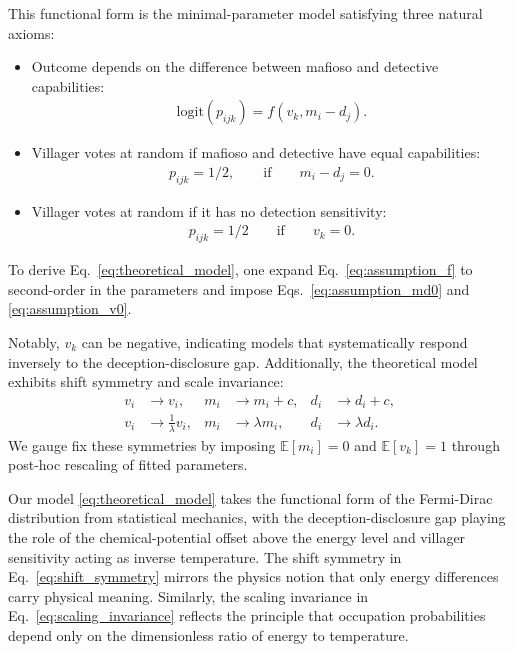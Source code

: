 \documentclass[sigconf]{aamas}
\begin{document}
This functional form is the minimal-parameter model satisfying three natural axioms:
\begin{itemize}
    \item Outcome depends on the difference between mafioso and detective capabilities:
    \begin{align}
        \text{logit}(p_{ijk})=f(v_k,m_i-d_j).
        \label{eq:assumption_f}
    \end{align}
    \item Villager votes at random if mafioso and detective have equal capabilities:
    \begin{align}
        p_{ijk}=1/2,\qquad\text{if} \qquad m_i-d_j=0.
        \label{eq:assumption_md0}
    \end{align}
    \item Villager votes at random if it has no detection sensitivity:
    \begin{align}
        p_{ijk}=1/2\qquad\text{if}\qquad v_k=0.
        \label{eq:assumption_v0}
    \end{align}
\end{itemize}
To derive Eq.~\eqref{eq:theoretical_model}, one expand Eq.~\eqref{eq:assumption_f} to second-order in the parameters and impose Eqs.~\eqref{eq:assumption_md0} and \eqref{eq:assumption_v0}.

Notably, $v_k$ can be negative, indicating models that systematically respond inversely to the deception-disclosure gap. Additionally, the theoretical model exhibits shift symmetry and scale invariance:
\begin{align}
    v_i &\rightarrow v_i, & m_i &\rightarrow m_i + c, & d_i &\rightarrow d_i + c,
    \label{eq:shift_symmetry} \\
    v_i &\rightarrow \frac{1}{\lambda} v_i, & m_i &\rightarrow \lambda m_i, & d_i &\rightarrow \lambda d_i. \label{eq:scaling_invariance}
\end{align}
We gauge fix these symmetries by imposing $\mathbb{E}[m_i]=0$ and $\mathbb{E}[v_k]=1$ through post-hoc rescaling of fitted parameters.


Our model \eqref{eq:theoretical_model} takes the functional form of the Fermi-Dirac distribution from statistical mechanics, with the deception-disclosure gap playing the role of the chemical-potential offset above the energy level and villager sensitivity acting as inverse temperature. The shift symmetry in Eq.~\eqref{eq:shift_symmetry} mirrors the physics notion that only energy differences carry physical meaning. Similarly, the scaling invariance in Eq.~\eqref{eq:scaling_invariance} reflects the principle that occupation probabilities depend only on the dimensionless ratio of energy to temperature.
\end{document}
